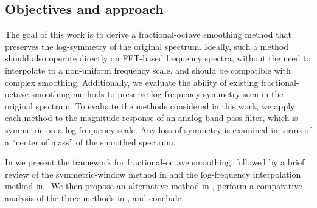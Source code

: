 \subsection{Objectives and approach}
The goal of this work is to derive a fractional-octave smoothing method that preserves the log-symmetry of the original spectrum.
Ideally, such a method should also operate directly on FFT-based frequency spectra, without the need to interpolate to a non-uniform frequency scale, and should be compatible with complex smoothing.
Additionally, we evaluate the ability of existing fractional-octave smoothing methods to preserve log-frequency symmetry seen in the original spectrum.
To evaluate the methods considered in this work, we apply each method to the magnitude response of an analog band-pass filter, which is symmetric on a log-frequency scale.
Any loss of symmetry is examined in terms of a ``center of mass'' of the smoothed spectrum.

In  we present the framework for fractional-octave smoothing, followed by a brief review of the symmetric-window method in  and the log-frequency interpolation method in .
We then propose an alternative method in , perform a comparative analysis of the three methods in , and conclude.